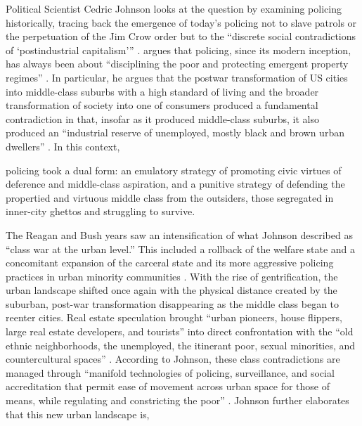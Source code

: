 \documentclass[12pt]{article}
\renewenvironment{quote}
  {\list{}{\leftmargin=\parindent\rightmargin=0pt}%
   \item\relax}
  {\endlist}
\begin{document}

Political Scientist Cedric Johnson looks at the question by examining policing historically, tracing back the emergence of today’s policing not to slave patrols or the perpetuation of the Jim Crow order but to the “discrete social contradictions of ‘postindustrial capitalism’” \parencite*[171]{johnsonTrumpismPolicingProblem2019}. \citeauthor{johnsonTrumpismPolicingProblem2019} argues that policing, since its modern inception, has always been about “disciplining the poor and protecting emergent property regimes” \parencite*[172]{johnsonTrumpismPolicingProblem2019}. In particular, he argues that the postwar transformation of US cities into middle-class suburbs with a high standard of living and the broader transformation of society into one of consumers produced a fundamental contradiction in that, insofar as it produced middle-class suburbs, it also produced an “industrial reserve of unemployed, mostly black and brown urban dwellers” \parencite*[171]{johnsonTrumpismPolicingProblem2019}. In this context,

\begin{quote}
policing took a dual form: an emulatory strategy of promoting civic virtues of deference and middle-class aspiration, and a punitive strategy of defending the propertied and virtuous middle class from the outsiders, those segregated in inner-city ghettos and struggling to survive. \parencite[176]{johnsonTrumpismPolicingProblem2019}
\end{quote}

The Reagan and Bush years saw an intensification of what Johnson described as “class war at the urban level.” This included a rollback of the welfare state and a concomitant expansion of the carceral state and its more aggressive policing practices in urban minority communities \parencites[177]{johnsonTrumpismPolicingProblem2019}{johnsonBlackLivesMatter2023}. With the rise of gentrification, the urban landscape shifted once again with the physical distance created by the suburban, post-war transformation disappearing as the middle class began to reenter cities. Real estate speculation brought “urban pioneers, house flippers, large real estate developers, and tourists” into direct confrontation with the “old ethnic neighborhoods, the unemployed, the itinerant poor, sexual minorities, and countercultural spaces” \parencite[177]{johnsonTrumpismPolicingProblem2019}. According to Johnson, these class contradictions are managed through “manifold technologies of policing, surveillance, and social accreditation that permit ease of movement across urban space for those of means, while regulating and constricting the poor” \parencite*[178]{johnsonTrumpismPolicingProblem2019}. Johnson further elaborates that this new urban landscape is,
\end{document}
